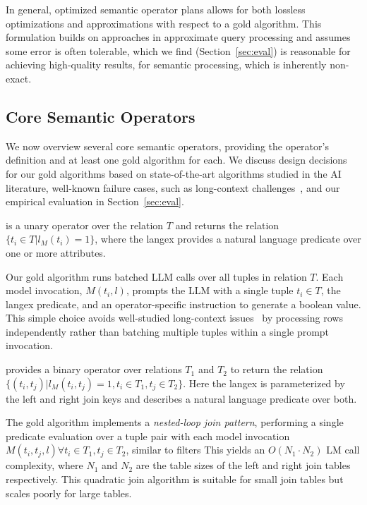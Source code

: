 In general, optimized semantic operator plans allows for both lossless optimizations and approximations with respect to a gold algorithm. This formulation builds on approaches in approximate query processing and assumes some error is often tolerable, which we find (Section~\ref{sec:eval}) is reasonable for achieving high-quality results, for semantic processing, which is inherently non-exact.







\subsection{Core Semantic Operators}

We now overview several core semantic operators, providing the operator's definition and at least one gold algorithm for each. We discuss design decisions for our gold algorithms based on state-of-the-art algorithms studied in the AI literature, well-known failure cases, such as long-context challenges~\cite{liu_lost_2023}, and our empirical evaluation in Section~\ref{sec:eval}.

 is a unary operator over the relation $T$ and returns the relation $\{t_i \in T | l_M(t_i) = 1\}$, where the langex provides a natural language predicate over one or more attributes. 


 Our gold algorithm runs batched LLM calls over all tuples in relation $T$. Each model invocation, $M(t_i, l)$, prompts the LLM with a single tuple $t_i\in T$, the langex predicate, and an operator-specific instruction to generate a boolean value. This simple choice avoids well-studied long-context issues~\cite{liu_lost_2023} by processing rows independently rather than batching multiple tuples within a single prompt invocation.


 provides a binary operator over relations $T_1$ and $T_2$ to return the relation $\{(t_i, t_j) | l_M(t_i, t_j) = 1, t_i \in T_1, t_j\in T_2 \}$. Here the langex is parameterized by the left and right join keys and describes a natural language predicate over both.

The gold algorithm implements a \emph{nested-loop join pattern}, performing a single predicate evaluation over a tuple pair with each model invocation $M(t_i, t_j, l) \forall t_i\in T_1, t_j\in T_2$, similar to filters This yields an $O(N_1 \cdot N_2)$ LM call complexity, where $N_1$ and $N_2$ are the table sizes of the left and right join tables respectively.
This quadratic join algorithm is suitable for small join tables but scales poorly for large tables. 



